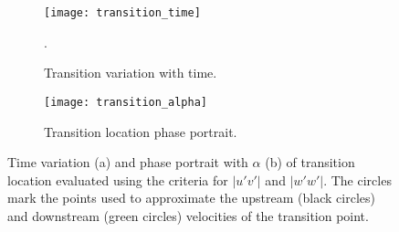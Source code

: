 \begin{figure}[h]
	\centering
	\begin{subfigure}[t]{0.45\textwidth}
		\centering
		\texttt{[image: transition\_time]}
		\caption{Transition variation with time.}. 
		\label{fig:transition_time}
	\end{subfigure}
	\begin{subfigure}[t]{0.45\textwidth}
		\centering
		\texttt{[image: transition\_alpha]}
		\caption{Transition location phase portrait.} 
		\label{fig:transition_alpha}
	\end{subfigure}
	\caption{Time variation (a) and phase portrait with $\alpha$ (b) of transition location evaluated using the criteria for $|u'v'|$ and $|w'w'|$. The circles mark the points used to approximate the upstream (black circles) and downstream (green circles) velocities of the transition point.}
	\label{fig:transition}
\end{figure}

